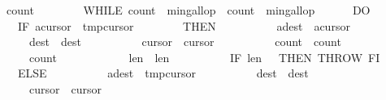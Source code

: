 \begin{isabellebody}
\ \ \ \ \ \ {\isasymacute}count{}\ {\isacharcolon}{\isacharequal}{\isacharequal}\ {}{\isacharsemicolon}{\isacharsemicolon}\isanewline
\ \ \ \ \ \ WHILE\ {\isacharparenleft}{\isasymacute}count{}\ {\isacharless}\ {\isasymacute}min{\isacharunderscore}gallop\ {\isacharampersand}\ {\isasymacute}count{}\ {\isacharless}\ {\isasymacute}min{\isacharunderscore}gallop{\isacharparenright}\isanewline
\ \ \ \ \ \ DO\isanewline
\ \ \ \ \ \ \ \ IF\ {\isasymacute}a{\isacharbang}{\isasymacute}cursor{}\ {\isacharless}\ {\isasymacute}tmp{\isacharbang}{\isasymacute}cursor{}\isanewline
\ \ \ \ \ \ \ \ THEN\isanewline
\ \ \ \ \ \ \ \ \ \ {\isasymacute}a{\isacharbang}{\isasymacute}dest\ {\isacharcolon}{\isacharequal}{\isacharequal}\ {\isasymacute}a{\isacharbang}{\isasymacute}cursor{}{\isacharsemicolon}{\isacharsemicolon}\isanewline
\ \ \ \ \ \ \ \ \ \ {\isasymacute}dest\ {\isacharcolon}{\isacharequal}{\isacharequal}\ {\isasymacute}dest{\isacharplus}{}{\isacharsemicolon}{\isacharsemicolon}\isanewline
\ \ \ \ \ \ \ \ \ \ {\isasymacute}cursor{}\ {\isacharcolon}{\isacharequal}{\isacharequal}\ {\isasymacute}cursor{}{\isacharplus}{}{\isacharsemicolon}{\isacharsemicolon}\isanewline
\ \ \ \ \ \ \ \ \ \ {\isasymacute}count{}\ {\isacharcolon}{\isacharequal}{\isacharequal}\ {\isasymacute}count{}{\isacharplus}{}{\isacharsemicolon}{\isacharsemicolon}\isanewline
\ \ \ \ \ \ \ \ \ \ {\isasymacute}count{}\ {\isacharcolon}{\isacharequal}{\isacharequal}\ {}{\isacharsemicolon}{\isacharsemicolon}\isanewline
\ \ \ \ \ \ \ \ \ \ {\isasymacute}len{}\ {\isacharcolon}{\isacharequal}{\isacharequal}\ {\isasymacute}len{}{\isacharminus}{}{\isacharsemicolon}{\isacharsemicolon}\isanewline
\ \ \ \ \ \ \ \ \ \ IF\ {\isasymacute}len{}\ {\isacharequal}\ {}\ THEN\ THROW\ FI\isanewline
\ \ \ \ \ \ \ \ ELSE\isanewline
\ \ \ \ \ \ \ \ \ \ {\isasymacute}a{\isacharbang}{\isasymacute}dest\ {\isacharcolon}{\isacharequal}{\isacharequal}\ {\isasymacute}tmp{\isacharbang}{\isasymacute}cursor{}{\isacharsemicolon}{\isacharsemicolon}\isanewline
\ \ \ \ \ \ \ \ \ \ {\isasymacute}dest\ {\isacharcolon}{\isacharequal}{\isacharequal}\ {\isasymacute}dest{\isacharplus}{}{\isacharsemicolon}{\isacharsemicolon}\isanewline
\ \ \ \ \ \ \ \ \ \ {\isasymacute}cursor{}\ {\isacharcolon}{\isacharequal}{\isacharequal}\ {\isasymacute}cursor{}{\isacharplus}{}{\isacharsemicolon}{\isacharsemicolon}\isanewline

\end{isabellebody}
